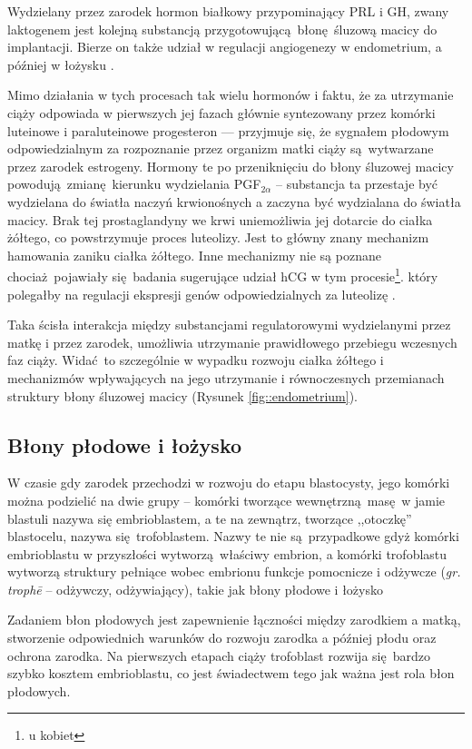 \documentclass[two column, twoside, a4paper]{article}
\begin{document}
Wydzielany przez zarodek hormon białkowy przypominający PRL i GH, zwany laktogenem jest kolejną substancją przygotowującą błonę śluzową macicy do implantacji. Bierze on także udział w regulacji angiogenezy w endometrium, a później w łożysku \autocite{Corbacho2002}.

Mimo działania w tych procesach tak wielu hormonów i faktu, że za utrzymanie ciąży odpowiada w pierwszych jej fazach głównie syntezowany przez komórki luteinowe i paraluteinowe progesteron --- przyjmuje się, że sygnałem płodowym odpowiedzialnym za rozpoznanie przez organizm matki ciąży są wytwarzane przez zarodek estrogeny. Hormony te po przeniknięciu do błony śluzowej macicy powodują zmianę kierunku wydzielania PGF$_{2\alpha}$ -- substancja ta przestaje być wydzielana do światła naczyń krwionośnych a zaczyna być wydzialana do światła macicy. Brak tej prostaglandyny we krwi uniemożliwia jej dotarcie do ciałka żółtego, co powstrzymuje proces luteolizy. Jest to główny znany mechanizm hamowania zaniku ciałka żółtego. Inne mechanizmy nie są poznane chociaż pojawiały się badania sugerujące udział hCG w tym procesie\footnote{u kobiet}. który polegałby na regulacji ekspresji genów odpowiedzialnych za luteolizę \autocite{Krzymowski2005, Dickinson2008}.

Taka ścisła interakcja między substancjami regulatorowymi wydzielanymi przez matkę i przez zarodek, umożliwia utrzymanie prawidłowego przebiegu wczesnych faz ciąży. Widać to szczególnie w wypadku rozwoju ciałka żółtego i mechanizmów wpływających na jego utrzymanie i równoczesnych przemianach struktury błony śluzowej macicy (Rysunek \ref{fig::endometrium}).

\subsection{Błony płodowe i łożysko}

W czasie gdy zarodek przechodzi w rozwoju do etapu blastocysty, jego komórki można podzielić na dwie grupy -- komórki tworzące wewnętrzną masę w jamie blastuli nazywa się embrioblastem, a te na zewnątrz, tworzące ,,otoczkę'' blastocelu, nazywa się trofoblastem. Nazwy te nie są przypadkowe gdyż komórki embrioblastu w przyszłości wytworzą właściwy embrion, a komórki trofoblastu wytworzą struktury pełniące wobec embrionu funkcje pomocnicze i odżywcze (\textit{gr. troph\={e}} -- odżywczy, odżywiający), takie jak błony płodowe i łożysko \autocite{Sadler2012, Bielanska2001}

Zadaniem błon płodowych jest zapewnienie łączności między zarodkiem a matką, stworzenie odpowiednich warunków do rozwoju zarodka a później płodu oraz ochrona zarodka. Na pierwszych etapach ciąży trofoblast rozwija się bardzo szybko kosztem embrioblastu, co jest świadectwem tego jak ważna jest rola błon płodowych.
\end{document}
